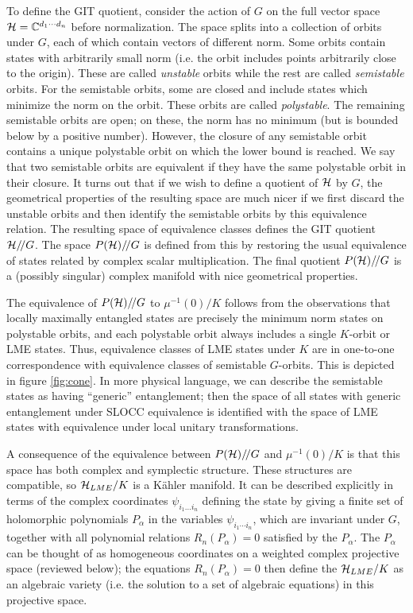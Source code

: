 \documentclass[12pt]{article}
\theoremstyle{definition}
\newcommand{\GITquot}{/\!/}
\begin{document}
To define the GIT quotient, consider the action of $G$ on the full
vector space ${\cal H} = \mathbb{C}^{d_1 \cdots d_n}$ before
normalization. The space splits into a collection of orbits under $G$,
each of which contain vectors of different norm. Some orbits contain
states with arbitrarily small norm (i.e. the orbit includes points
arbitrarily close to the origin). These are called {\it unstable}
orbits while the rest are called {\it semistable} orbits. For the
semistable orbits, some are closed and include states which minimize
the norm on the orbit. These orbits are called {\it polystable}. The
remaining semistable orbits are open; on these, the norm has no
minimum (but is bounded below by a positive number). However, the
closure of any semistable orbit contains a unique polystable orbit on
which the lower bound is reached. We say that two semistable orbits
are equivalent if they have the same polystable orbit in their
closure. It turns out that if we wish to define a quotient of ${\cal
H}$ by $G$, the geometrical properties of the resulting space are much
nicer if we first discard the unstable orbits and then identify the
semistable orbits by this equivalence relation. The resulting space of
equivalence classes defines the GIT quotient ${\cal H}\GITquot G$. The
space $P({\cal H})\GITquot G$ is defined from this by restoring the
usual equivalence of states related by complex scalar
multiplication. The final quotient $P({\cal H})\GITquot G$ is a
(possibly singular) complex manifold with nice geometrical properties.

The equivalence of $P({\cal H})\GITquot G$ to $\mu^{-1}(0)/K$ follows
from the observations that locally maximally entangled states are
precisely the minimum norm states on polystable orbits, and each
polystable orbit always includes a single $K$-orbit or LME
states. Thus, equivalence classes of LME states under $K$ are in
one-to-one correspondence with equivalence classes of semistable
$G$-orbits. This is depicted in figure \ref{fig:cone}. In more
physical language, we can describe the semistable states as having
``generic'' entanglement; then the space of all states with generic
entanglement under SLOCC equivalence is identified with the space of
LME states with equivalence under local unitary transformations.

A consequence of the equivalence between $P({\cal H})\GITquot G$ and
$\mu^{-1}(0)/K$ is that this space has both complex and symplectic
structure. These structures are compatible, so ${\cal H}_{LME}/K$ is a
K\"ahler manifold. It can be described explicitly in terms of the
complex coordinates $\psi_{i_1 \dots i_n}$ defining the state by
giving a finite set of holomorphic polynomials $P_{\alpha }$ in the
variables $\psi_{i_{1}\dotsb i_{n}}$, which are invariant under $G$,
together with all polynomial relations $R_n(P_\alpha ) = 0$ satisfied
by the $P_{\alpha }$. The $P_\alpha $ can be thought of as homogeneous
coordinates on a weighted complex projective space (reviewed below); the equations
$R_n(P_\alpha ) = 0$ then define the ${\cal H}_{LME}/K$ as an
algebraic variety (i.e. the solution to a set of algebraic equations)
in this projective space.
\end{document}
